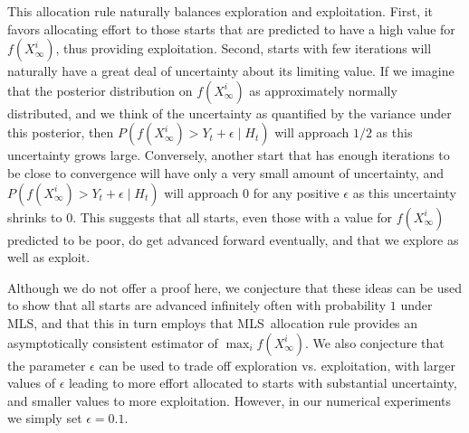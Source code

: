 \documentclass[12pt,english]{article}
\newcommand{\stedit}[1]{{\color{blue} #1}}
\newcommand{\abbrv}{MLS}
\begin{document}
This allocation rule naturally balances exploration and exploitation.  First, it favors allocating effort to those starts that are predicted to have a high value for $f(X_\infty^i)$, thus providing exploitation. 
Second, starts with few iterations will naturally have a great deal of uncertainty about its limiting value.  If we imagine that the posterior distribution on $f(X_{\infty}^{i})$ as approximately normally distributed, and we think of the uncertainty as quantified by the variance under this posterior, then  $P\left(f\left(X_{\infty}^{i}\right)>Y_t+\epsilon\mid H_{t}\right)$ will approach $1/2$ as this uncertainty grows large.   Conversely, another start that has enough iterations to be close to convergence will have only a very small amount of uncertainty, and  $P\left(f\left(X_{\infty}^{i}\right)>Y_t+\epsilon\mid H_{t}\right)$ will approach $0$ for any positive $\epsilon$ as this uncertainty shrinks to $0$. 
This suggests that all starts, even those with a value for $f(X_\infty^i)$ predicted to be poor, do get advanced forward eventually, and that we explore as well as exploit.

Although we do not offer a proof here, we conjecture that these ideas can be used to show that all starts are advanced infinitely often with probability $1$ under \abbrv, and that this in turn employs that \abbrv\ allocation rule provides an asymptotically consistent estimator of $\max_i f(X_\infty^i)$.
We also conjecture that the parameter $\epsilon$ can be used to trade off exploration vs. exploitation, with larger values of $\epsilon$ leading to more effort allocated to starts with substantial uncertainty, and smaller values to more exploitation. However, in our numerical experiments we simply set $\epsilon=0.1$.


\end{document}
